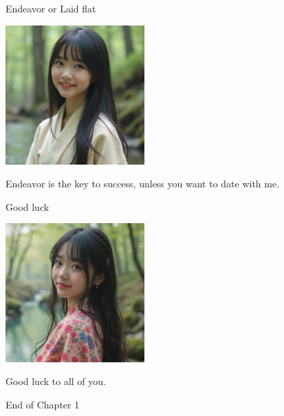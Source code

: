\documentclass{beamer}
\begin{document}
\begin{frame}{Endeavor or Laid flat}
\begin{center}
\includegraphics[width=0.4\textwidth]{fail.png}
\end{center}
\begin{center}
Endeavor is the key to success, unless you want to date with me.
\end{center}
\end{frame}
\begin{frame}{Good luck}
\begin{center}
\includegraphics[width=0.4\textwidth]{good_luck.png}
\end{center}
\begin{center}
Good luck to all of you.
\end{center}
\end{frame}
\begin{frame}{}
\begin{center}
\Large{End of Chapter 1}
\end{center}
\end{frame}
\end{document}
